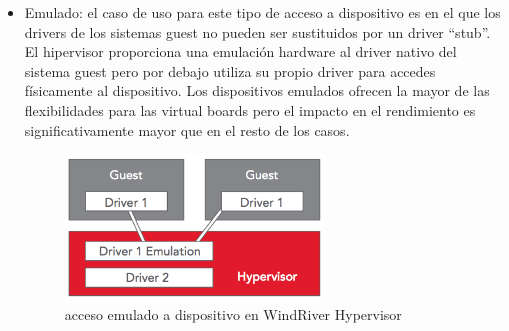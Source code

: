 \begin{itemize}
  \item Emulado: el caso de uso para este tipo de acceso a dispositivo es en el que los drivers de los sistemas guest no pueden ser sustituidos por un driver ``stub''. El hipervisor proporciona una emulación hardware al driver nativo del sistema guest pero por debajo utiliza su propio driver para accedes físicamente al dispositivo. Los dispositivos emulados ofrecen la mayor de las flexibilidades para las virtual boards pero el impacto en el rendimiento es significativamente mayor que en el resto de los casos.
  \begin{figure}[!htb]
  	\centering
  	\includegraphics[width=0.65\textwidth]{recursos/windriver_drv_3.png}
  	\caption{acceso emulado a dispositivo en WindRiver Hypervisor}
  	\label{fig:windriver_drv_3}
  \end{figure}

\end{itemize}

